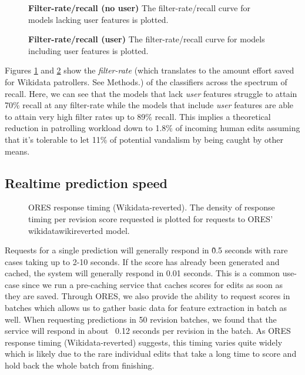 \documentclass{sig-alternate}
\begin{document}
\begin{figure}
\label{fig:filter_rate_no_user}
\centering
{}
\caption{\textbf{Filter-rate/recall (no user)} The filter-rate/recall curve for models lacking user features is plotted.}
\end{figure}

\begin{figure}
\label{fig:filter_rate_user}
\centering
{}
\caption{\textbf{Filter-rate/recall (user)} The filter-rate/recall curve for models including user features is plotted.}
\end{figure}


Figures \ref{fig:filter_rate_no_user} and \ref{fig:filter_rate_user} show the \textit{filter-rate} (which translates to the amount effort saved for Wikidata patrollers.  See Methods.) of the classifiers across the spectrum of recall.  Here, we can see that the models that lack \textit{user} features struggle to attain 70\% recall at any filter-rate while the models that include \textit{user} features are able to attain very high filter rates up to 89\% recall.  This implies a theoretical reduction in patrolling workload down to 1.8\% of incoming human edits assuming that it's tolerable to let 11\% of potential vandalism by being caught by other means.
\subsection{Realtime prediction speed}
\begin{figure}
\centering
{}
\caption{ORES response timing (Wikidata-reverted). The density of response timing per revision score requested is plotted for requests to ORES' wikidatawiki\-reverted model.}
\end{figure}
Requests for a single prediction will generally respond in \~0.5 seconds with rare cases taking up to 2-10 seconds.  If the score has already been generated and cached, the system will generally respond in 0.01 seconds.  This is a common use-case since we run a pre-caching service that caches scores for edits as soon as they are saved.  Through ORES, we also provide the ability to request scores in batches which allows us to gather basic data for feature extraction in batch as well.  When requesting predictions in 50 revision batches, we found that the service will respond in about ~0.12 seconds per revision in the batch.  As ORES response timing (Wikidata-reverted) suggests, this timing varies quite widely which is likely due to the rare individual edits that take a long time to score and hold back the whole batch from finishing.
\end{document}
